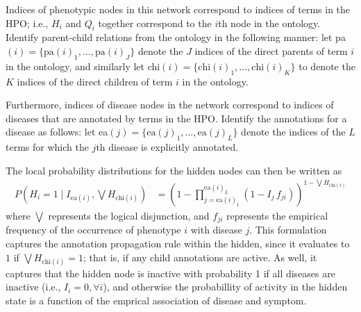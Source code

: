 Indices of phenotypic nodes in this network correspond to indices of terms in
the HPO;
%
i.e., $H_i$ and $Q_i$ together correspond to the $i$th node in the ontology.
%
Identify parent-child relations from the ontology in the following manner:
%
let pa$(i) = \{\text{pa}(i)_1, \hdots, \text{pa}(i)_J\}$ denote the $J$ indices
of the direct parents of term $i$ in the ontology, 
%
and similarly let chi$(i) = \{\text{chi}(i)_1, \hdots, \text{chi}(i)_K\}$ to
denote the $K$ indices of the direct children of term $i$ in the ontology.

Furthermore, indices of disease nodes in the network correspond to indices of
diseases that are annotated by terms in the HPO.
%
Identify the annotations for a disease as follows: let ea$(j) =
\{\text{ea}(j)_1, \hdots, \text{ea}(j)_L\}$ denote the indices of the $L$ terms
for which the $j$th disease is explicitly annotated.

The local probability distributions for the hidden nodes can then be written as
%
\begin{align}
    P \left(H_i = 1 \mid I_{\text{ea}(i)}, \bigvee H_{\text{chi}(i)}\right)
    &= \left(
        1 - \prod_{j=\text{ea}(i)_1}^{\text{ea}(i)_L}
        \left(1 - I_j \, f_{ji}\right)
    \right)
    ^{1 - \bigvee H_{\text{chi}(i)}}
    \label{eq:lpdhids}
\end{align}
%
where $\bigvee$ represents the logical disjunction, and $f_{ji}$ represents the
empirical frequency of the occurrence of phenotype $i$ with disease $j$.
%
This formulation captures the annotation propagation rule within the hidden,
since it evaluates to $1$ if $\bigvee H_{\text{chi}(i)} = 1$; that is, if any
child annotations are active.
%
As well, it captures that the hidden node is inactive with probability 1 if all
diseases are inactive (i.e., $I_i = 0, \forall i$), and otherwise the
probabillity of activity in the hidden state is a function of the emprical
association of disease and symptom.

